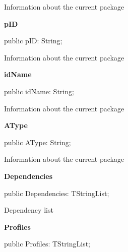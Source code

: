 \documentclass{report}
\newif\ifpdf
\begin{document}
\begin{list}{}
\begin{flushleft}
\ifpdf
\end{flushleft}
\fi


\par Information about the current package\label{imainunit.TIWizFrm-pID}
\item[\textbf{pID}\hfill]
\ifpdf
\begin{flushleft}
\fi
\begin{ttfamily}
public pID: String;\end{ttfamily}

\ifpdf
\end{flushleft}
\fi


\par Information about the current package\label{imainunit.TIWizFrm-idName}
\item[\textbf{idName}\hfill]
\ifpdf
\begin{flushleft}
\fi
\begin{ttfamily}
public idName: String;\end{ttfamily}

\ifpdf
\end{flushleft}
\fi


\par Information about the current package\label{imainunit.TIWizFrm-AType}
\item[\textbf{AType}\hfill]
\ifpdf
\begin{flushleft}
\fi
\begin{ttfamily}
public AType: String;\end{ttfamily}

\ifpdf
\end{flushleft}
\fi


\par Information about the current package\label{imainunit.TIWizFrm-Dependencies}
\item[\textbf{Dependencies}\hfill]
\ifpdf
\begin{flushleft}
\fi
\begin{ttfamily}
public Dependencies: TStringList;\end{ttfamily}

\ifpdf
\end{flushleft}
\fi


\par Dependency list\label{imainunit.TIWizFrm-Profiles}
\item[\textbf{Profiles}\hfill]
\ifpdf
\begin{flushleft}
\fi
\begin{ttfamily}
public Profiles: TStringList;\end{ttfamily}


\end{flushleft}
\end{list}
\end{document}
